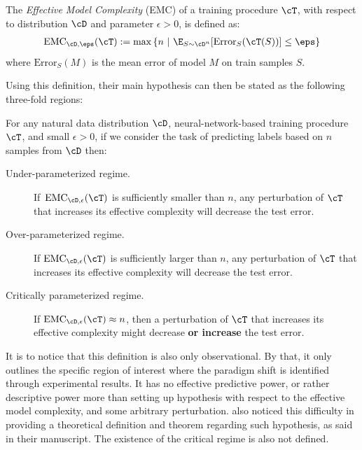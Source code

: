 \documentclass[
  journal=largetwo,
  year=2025,
  volume=37,
]{cup-journal}
\begin{document}
\newcommand{\EMC}{\mathrm{EMC}}
\begin{definition}
The \emph{Effective Model Complexity} (EMC) of a training procedure $\cT$, with respect to distribution $\cD$ and parameter $\epsilon>0$,
is defined as:
\begin{align*}
    \EMC_{\cD,\eps}(\cT)
    :=  \max \left\{n ~|~ \E_{S \sim \cD^n}[ \mathrm{Error}_S( \cT( S )  ) ] \leq \eps \right\}
    \end{align*}
    where $\mathrm{Error}_S(M)$ is the mean error of model $M$ on train samples $S$.
\end{definition}

Using this definition, their main hypothesis can then be stated as the following three-fold regions:

\begin{hypothesis} \label{hyp:informaldd}
For any natural data distribution $\cD$, neural-network-based training procedure $\cT$, and small $\epsilon>0$,
if we consider the task of predicting labels based on  $n$ samples from $\cD$ then:
\begin{description}
    \item[Under-parameterized regime.]  If~$\EMC_{\cD,\epsilon}(\cT)$ is sufficiently smaller than $n$, any perturbation of $\cT$ that increases its effective complexity will decrease the test error.
    \item[Over-parameterized regime.] If $\EMC_{\cD,\epsilon}(\cT)$ is sufficiently larger than $n$,
    any perturbation of $\cT$ that increases its effective complexity will decrease the test error.
    
    \item[Critically parameterized regime.] If $\EMC_{\cD,\epsilon}(\cT) \approx n$, then
    a perturbation of $\cT$ that increases its effective complexity
    might decrease {\bf or increase} the test error.
\end{description}
\end{hypothesis}

It is to notice that this definition is also only observational. By that, it only outlines the specific region of interest where the paradigm shift is identified through experimental results. It has no effective predictive power, or rather descriptive power more than setting up hypothesis with respect to the effective model complexity, and some arbitrary perturbation. \cite{nakkiran_deep_2019} also noticed this difficulty in providing a theoretical definition and theorem regarding such hypothesis, as said in their manuscript. The existence of the critical regime is also not defined. 
\end{document}
